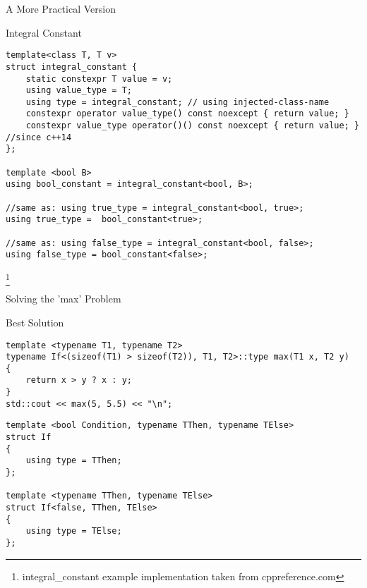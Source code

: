 \documentclass[aspectratio=169]{beamer}
\newcommand\blfootnote[1]{%
  \begingroup
  \renewcommand\thefootnote{}\footnote{#1}%
  \addtocounter{footnote}{-1}%
  \endgroup
}
\begin{document}
\begin{frame}[fragile]{A More Practical Version}
    
    \scriptsize
    \begin{block}{Integral Constant}
        \begin{verbatim}
template<class T, T v>
struct integral_constant {
    static constexpr T value = v;
    using value_type = T;
    using type = integral_constant; // using injected-class-name
    constexpr operator value_type() const noexcept { return value; }
    constexpr value_type operator()() const noexcept { return value; } //since c++14
};

template <bool B>
using bool_constant = integral_constant<bool, B>;

//same as: using true_type = integral_constant<bool, true>;
using true_type =  bool_constant<true>;

//same as: using false_type = integral_constant<bool, false>;
using false_type = bool_constant<false>;
        \end{verbatim}
    \end{block}
    
    \blfootnote{integral\_constant example implementation taken from cppreference.com}
\end{frame}


\begin{frame}[fragile]{Solving the 'max' Problem}

    \scriptsize
    \begin{block}{Best Solution}
        \begin{verbatim}
template <typename T1, typename T2>
typename If<(sizeof(T1) > sizeof(T2)), T1, T2>::type max(T1 x, T2 y)
{
    return x > y ? x : y;
}
std::cout << max(5, 5.5) << "\n";
        \end{verbatim}
    \end{block}

    \begin{block}{}
        \begin{verbatim}
template <bool Condition, typename TThen, typename TElse>
struct If
{
    using type = TThen;
};

template <typename TThen, typename TElse>
struct If<false, TThen, TElse>
{
    using type = TElse;
};
        \end{verbatim}
    \end{block}

\end{frame}
\end{document}
